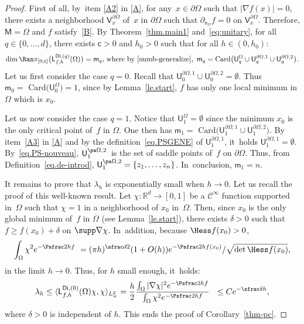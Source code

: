 \begin{proof}
First of all, by~item \eqref{A2} in \ref{A}, for any~$x\in \partial \Omega$ such that $\vert \nabla f(x)\vert =0$, there exists a neighborhood $\mathsf V_x^{\partial \Omega}$ of~$x$ in $\partial \Omega$ such that $ \partial_{\mathsf n_{ \Omega}}f =0 \text{ on } \mathsf V_x^{\partial \Omega}$.
Therefore, $\mathsf M=\Omega$ and $f$ satisfy~\ref{B}.
By Theorem~\ref{thm.main1} and~\eqref{eq:unitary},
for all $q\in \{0,\ldots,d\}$, there exists $\mathsf c>0$ and $h_0>0$ such that for all $h\in (0,h_0)$:
\[
\dim \Ran \pi_{[0,\mathsf c]}\bigl(\mathsf L_{f,h}^{\mathsf{Di},(q)}(\Omega)\bigr)=\mathsf m_q, \,
\text{where by~\eqref{numb-generalize}, }\,
\mathsf m_q=\text{Card}\bigl(\mathsf U_q^{\Omega}\cup \mathsf U^{\partial \Omega,1}_q\cup \mathsf U^{\partial \Omega,2}_q\bigr).
\]
Let us first consider the case $q=0$. Recall that $ \mathsf
U^{\partial \Omega,1}_0\cup \mathsf U^{\partial
\Omega,2}_0=\emptyset$. Thus $\mathsf m_0=\text{ Card}\bigl(\mathsf
U_0^{\Omega})=1$, since by Lemma~\ref{le.start}, $f$ has only one
local minimum in $\Omega$ which is $x_0$.

Let us now consider the case $q=1$. Notice that
$\mathsf U_1^{\Omega}=\emptyset$ since the minimum $x_0$ is the
only
critical point of~$f$ in $\Omega$. One then has
$\mathsf m_1=\text{ Card}\bigl(\mathsf U^{\partial \Omega,1}_1\cup
\mathsf U^{\partial \Omega,2}_1\bigr)$. By item~\eqref{A3} in \ref{A} and
by the definition~\eqref{eq.PSGENE} of $\mathsf U^{\partial \Omega,1}_1$, it~holds $\mathsf U^{\partial \Omega,1}_1=\emptyset$.
By~\eqref{eq.PS-nouveau}, $\mathsf U_1^{\pa \Omega,2}$~is the set
of saddle points of~$f$ on $\partial \Omega$. Thus, from
Definition~\ref{eq.de-introd}, $\mathsf U_1^{\pa
\Omega,2}=\{z_1,\ldots,z_n\}$. In~conclusion, $\mathsf m_1= n$.

It remains to prove that $\lambda_h$ is exponentially small when $h\to
0$. Let us recall the proof of this well-known result. Let $\chi:\mathbb R^d\to [0,1]$ be a $\mathcal C^\infty$ function supported in~$\Omega$ such that $\chi=1$ in a neighborhood of $x_0$ in~$\Omega$. Then, since $x_0$ is the only global minimum of~$f$ in $\overline \Omega$ (see Lemma~\ref{le.start}), there exists $\delta>0$ such that $f\ge f(x_0)+\delta$ on $\supp \nabla \chi$. In~addition, because $\Hess f(x_0)>0$,
\[
\int_{\Omega} \chi^2 e^{-\Psfrac 2h f}  = (\pi h)^{\sfrac d2} (1+O(h))e^{-\Psfrac 2h f(x_0)} /\sqrt{\det \Hess f(x_0)},
\]
in the limit $h\to 0$. Thus, for $h$ small enough, it~holds:\vspace*{-3pt}
\[
\lambda_h\le \langle \mathsf L_{f,h}^{\mathsf{Di}, (0)}(\Omega)\chi, \chi\rangle_{L^2_w}= \frac h2 \frac {\int_{\Omega} |\nabla \chi|^2 e^{-\Psfrac 2h f} }{\int_{\Omega} \chi^2 e^{-\Psfrac 2h f}}  \le Ce^{-\sfrac \delta h},
\]
where $\delta>0$ is independent of $h$.
This ends the proof of Corollary~\ref{thm-pc}.
\end{proof}

